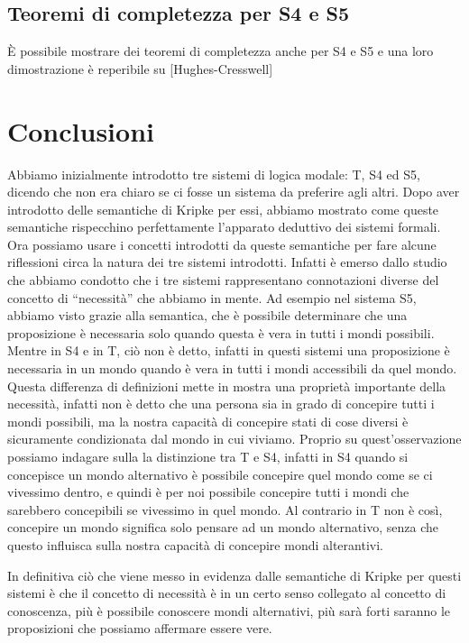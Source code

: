 \documentclass[a4paper, 12pt]{article}
\begin{document}
\subsection{Teoremi di completezza per S4 e S5}
È possibile mostrare dei teoremi di completezza anche per S4 e S5 e una loro dimostrazione
è reperibile su [Hughes-Cresswell]

\section{Conclusioni}
Abbiamo inizialmente introdotto tre sistemi di logica modale: T, S4 ed S5,
dicendo che non era chiaro se ci fosse un sistema da preferire agli altri.
Dopo aver introdotto delle semantiche di Kripke per essi, abbiamo mostrato
come queste semantiche rispecchino perfettamente l'apparato deduttivo dei sistemi formali.
Ora possiamo usare i concetti introdotti da queste semantiche per fare alcune riflessioni
circa la natura dei tre sistemi introdotti. Infatti è emerso dallo studio che abbiamo condotto
che i tre sistemi rappresentano connotazioni diverse del concetto di ``necessità''
che abbiamo in mente.
Ad esempio nel sistema S5, abbiamo visto grazie alla semantica, che è possibile
determinare che una proposizione è necessaria solo quando questa è vera in tutti i mondi
possibili. Mentre in S4 e in T, ciò non è detto, infatti in questi sistemi una proposizione
è necessaria in un mondo quando è vera in tutti i mondi accessibili da quel mondo.
Questa differenza di definizioni mette in mostra una proprietà importante della necessità,
infatti non è detto che una persona sia in grado di concepire tutti i mondi possibili,
ma la nostra capacità di concepire stati di cose diversi è sicuramente condizionata dal mondo
in cui viviamo. Proprio su quest'osservazione possiamo indagare sulla la distinzione tra T e S4,
infatti in S4 quando si concepisce un mondo alternativo è possibile concepire quel mondo
come se ci vivessimo dentro, e quindi è per noi possibile concepire tutti i mondi che sarebbero
concepibili se vivessimo in quel mondo. Al contrario in T non è così, concepire un mondo
significa solo pensare ad un mondo alternativo, senza che questo influisca sulla nostra capacità
di concepire mondi alterantivi.

In definitiva ciò che viene messo in evidenza dalle semantiche di Kripke per questi sistemi è
che il concetto di necessità è in un certo senso collegato al concetto di conoscenza, più
è possibile conoscere mondi alternativi, più sarà forti saranno le proposizioni che possiamo
affermare essere vere.
\end{document}
